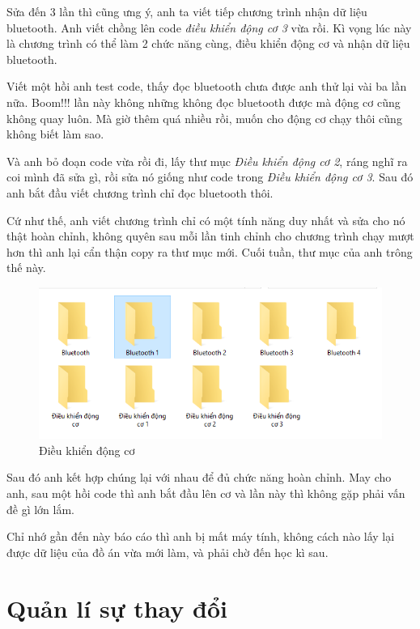Sửa đến 3 lần thì cũng ưng ý, anh ta viết tiếp chương trình nhận dữ liệu bluetooth. Anh viết chồng lên code \textit{điều khiển động cơ 3} vừa rồi. Kì vọng lúc này là chương trình có thể làm 2 chức năng cùng, điều khiển động cơ và nhận dữ liệu bluetooth.

Viết một hồi anh test code, thấy đọc bluetooth chưa được anh thử lại vài ba lần nữa. Boom!!! lần này không những không đọc bluetooth được mà động cơ cũng không quay luôn. Mà giờ thêm quá nhiều rồi, muốn cho động cơ chạy thôi cũng không biết làm sao.

Và anh bỏ đoạn code vừa rồi đi, lấy thư mục \textit{Điều khiển động cơ 2}, ráng nghĩ ra coi mình đã sửa gì, rồi sửa nó giống như code trong \textit{Điều khiển động cơ 3}. Sau đó anh bắt đầu viết chương trình chỉ đọc bluetooth thôi.

Cứ như thế, anh viết chương trình chỉ có một tính năng duy nhất và sửa cho nó thật hoàn chỉnh, không quyên sau mỗi lần tinh chỉnh cho chương trình chạy mượt hơn thì anh lại cẩn thận copy ra thư mục mới. Cuối tuần, thư mục của anh trông thế này.

\begin{figure}[h!]
    \centering
    \includegraphics[width=1\linewidth]{images/DongCoBluetooth.PNG}
    \caption{Điều khiển động cơ}
\end{figure}

Sau đó anh kết hợp chúng lại với nhau để đủ chức năng hoàn chỉnh. May cho anh, sau một hồi code thì anh bắt đầu lên cơ và lần này thì không gặp phải vấn đề gì lớn lắm.

Chỉ nhớ gần đến này báo cáo thì anh bị mất máy tính, không cách nào lấy lại được dữ liệu của đồ án vừa mới làm, và phải chờ đến học kì sau.

\section{Quản lí sự thay đổi}

